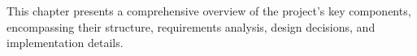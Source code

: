 This chapter presents a comprehensive overview of the project's key components, encompassing their structure, requirements analysis, design decisions, and implementation details. 